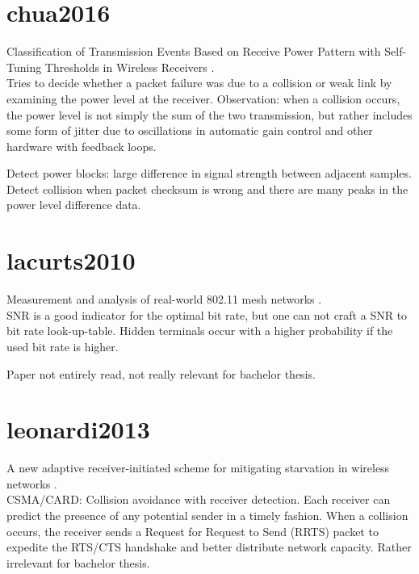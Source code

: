 \section{chua2016}

Classification of Transmission Events Based on Receive Power Pattern with Self-Tuning Thresholds in Wireless Receivers \cite{chua2016}.\\

Tries to decide whether a packet failure was due to a collision or weak link by examining the power level at the receiver. Observation: when a collision occurs, the power level is not simply the sum of the two transmission, but rather includes some form of jitter due to oscillations in automatic gain control and other hardware with feedback loops.

Detect power blocks: large difference in signal strength between adjacent samples. Detect collision when packet checksum is wrong and there are many peaks in the power level difference data.



\section{lacurts2010}

Measurement and analysis of real-world 802.11 mesh networks \cite{lacurts2010}.\\

SNR is a good indicator for the optimal bit rate, but one can not craft a SNR to bit rate look-up-table. Hidden terminals occur with a higher probability if the used bit rate is higher.

Paper not entirely read, not really relevant for bachelor thesis.



\section{leonardi2013}

A new adaptive receiver-initiated scheme for mitigating starvation in wireless networks \cite{leonardi2013}.\\

CSMA/CARD: Collision avoidance with receiver detection. Each receiver can predict the presence of any potential sender in a timely fashion. When a collision occurs, the receiver sends a Request for Request to Send (RRTS) packet to expedite the RTS/CTS handshake and better distribute network capacity. Rather irrelevant for bachelor thesis.


